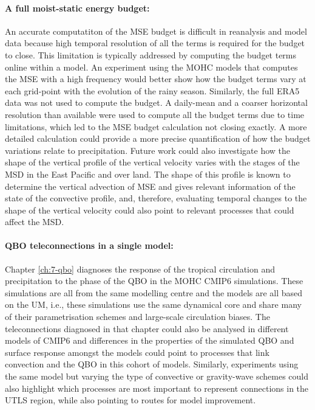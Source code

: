 \paragraph{A full moist-static energy budget:}
An accurate computatiton of the MSE budget is difficult in reanalysis and model data because high temporal resolution of all the terms is required for the budget to close. 
This limitation is typically addressed by computing the budget terms online within a model. 
An experiment using the MOHC models that computes the MSE with a high frequency would better show how the budget terms vary at each grid-point with the evolution of the rainy season. 
Similarly, the full ERA5 data was not used to compute the budget. A daily-mean and a coarser horizontal resolution than available were used to compute all the budget terms due to time limitations, which led to the MSE budget calculation not closing exactly. 
A more detailed calculation could provide a more precise quantification of how the budget variations relate to precipitation. 
Future work could also investigate how the shape of the vertical profile of the vertical velocity varies with the stages of the MSD in the East Pacific and over land. 
The shape of this profile is known to determine the vertical advection of MSE and gives relevant information of the state of the convective profile, and, therefore, evaluating temporal changes to the shape of the vertical velocity could also point to relevant processes that could affect the MSD.

\paragraph{QBO teleconnections in a single model:}
Chapter \ref{ch:7-qbo} diagnoses the response of the tropical circulation and precipitation to the phase of the QBO in the MOHC CMIP6 simulations. 
These simulations are all from the same modelling centre and the models are all based on the UM, i.e., these simulations use the same dynamical core and share many of their parametrisation schemes and large-scale circulation biases. 
The teleconnections diagnosed in that chapter could also be analysed in different models of CMIP6 and differences in the properties of the simulated QBO and surface response amongst the models could point to processes that link convection and the QBO in this cohort of models. 
Similarly, experiments using the same model but varying the type of convective or gravity-wave schemes could also highlight which processes are most important to represent connections in the UTLS region, while also pointing to routes for model improvement. 

